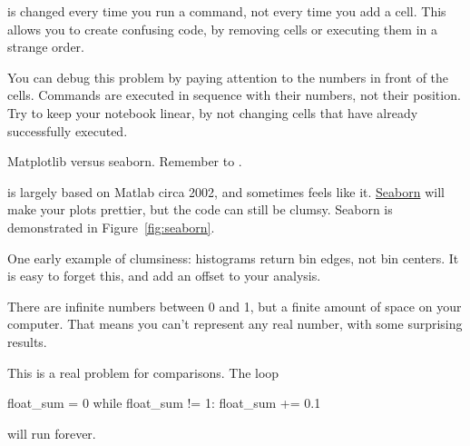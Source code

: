 \documentclass[justified, nobib]{tufte-handout}
\begin{document}
 is changed every time you run a command, not
every time you add a cell.
This allows you to create confusing code, by removing cells or executing them in a strange order.



\noindent
You can debug this problem by paying attention to the numbers in front of the cells.
Commands are executed in sequence with their numbers, not their position.
Try to keep your notebook linear, by not changing cells that have already successfully executed.

\pagebreak
\begin{marginfigure}
    \vspace*{\fill}
    \centering

    \def\svgwidth{140pt}

    \vspace*{\fill}
    \bigskip
    \def\svgwidth{140pt}
  \caption{Matplotlib versus seaborn.
  \hspace{\textwidth}Remember to .}
\label{fig:seaborn}
\end{marginfigure}

 is largely based on Matlab circa 2002, and sometimes feels like it. \href{https://stanford.edu/~mwaskom/software/seaborn/index.html}{Seaborn} will make your plots prettier, but the code can still be clumsy. Seaborn is demonstrated in Figure~\ref{fig:seaborn}.

\noindent
One early example of clumsiness: histograms return bin edges, not bin centers.
It is easy to forget this, and add an offset to your analysis.



There are infinite numbers between 0 and 1, but a finite amount of space on your computer.
That means you can't represent any real number, with some surprising results.



\noindent
This is a real problem for comparisons.
The loop
\begin{pythoncode}
        float_sum = 0
        while float_sum != 1:
            float_sum += 0.1
\end{pythoncode}

\noindent
will run forever.
\end{document}
